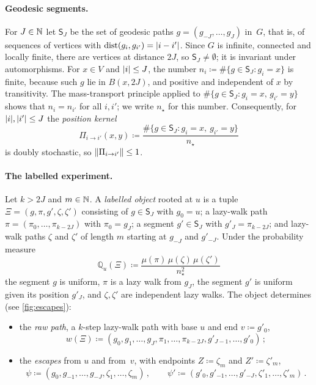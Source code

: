 \paragraph{Geodesic segments.}
For $J\in\mathbb N$ let $\mathsf S_J$ be the set of geodesic paths $g=(g_{-J},\dots,g_J)$ in~$G$, that is, of
sequences of vertices with $\operatorname{dist}(g_i,g_{i'})=\lvert i-i'\rvert$. Since $G$ is infinite, connected and locally
finite, there are vertices at distance $2J$, so $\mathsf S_J\neq\emptyset$; it is invariant under
automorphisms. For $x\in V$ and $\lvert i\rvert\le J$, the number $n_i\coloneqq\#\{g\in\mathsf S_J\colon
g_i=x\}$ is finite, because such $g$ lie in $B(x,2J)$, and positive and independent of $x$ by
transitivity. The mass-transport principle applied to $\#\{g\in\mathsf S_J\colon g_i=x,\,g_{i'}=y\}$
shows that $n_i=n_{i'}$ for all $i,i'$; we write $n_\star$ for this number. Consequently, for
$\lvert i\rvert,\lvert i'\rvert\le J$ the \emph{position kernel}
\begin{equation*}
  \Pi_{i\to i'}(x,y)\coloneqq\frac{\#\{g\in\mathsf S_J\colon g_i=x,\ g_{i'}=y\}}{n_\star}
\end{equation*}
is doubly stochastic, so $\lVert\Pi_{i\to i'}\rVert\le1$.

\paragraph{The labelled experiment.}
Let $k>2J$ and $m\in\mathbb N$. A \emph{labelled object} rooted at $u$ is a tuple $\Xi=(g,\pi,g',\zeta,\zeta')$
consisting of $g\in\mathsf S_J$ with $g_0=u$; a lazy-walk path $\pi=(\pi_0,\dots,\pi_{k-2J})$ with
$\pi_0=g_J$; a segment $g'\in\mathsf S_J$ with $g'_J=\pi_{k-2J}$; and lazy-walk paths $\zeta$ and
$\zeta'$ of length $m$ starting at $g_{-J}$ and $g'_{-J}$. Under the probability measure
\begin{equation}\label{eq:labelled-law}
  \mathbb Q_u(\Xi)\coloneqq\frac{\mu(\pi)\,\mu(\zeta)\,\mu(\zeta')}{n_\star^2}
\end{equation}
the segment $g$ is uniform, $\pi$ is a lazy walk from $g_J$, the segment $g'$ is uniform given its
position $g'_J$, and $\zeta,\zeta'$ are independent lazy walks. The object determines (see
\cref{fig:escapes}):
\begin{itemize}
  \item the \emph{raw path}, a $k$-step lazy-walk path with base $u$ and end $v\coloneqq g'_0$,
  \begin{equation*}
    w(\Xi)\coloneqq(g_0,g_1,\dots,g_J,\pi_1,\dots,\pi_{k-2J},g'_{J-1},\dots,g'_0)\,;
  \end{equation*}
  \item the \emph{escapes} from $u$ and from~$v$, with endpoints $Z\coloneqq\zeta_m$ and
  $Z'\coloneqq\zeta'_m$,
  \begin{equation*}
    \psi\coloneqq(g_0,g_{-1},\dots,g_{-J},\zeta_1,\dots,\zeta_m)\,,\qquad
    \psi'\coloneqq(g'_0,g'_{-1},\dots,g'_{-J},\zeta'_1,\dots,\zeta'_m)\,.
  \end{equation*}
\end{itemize}

